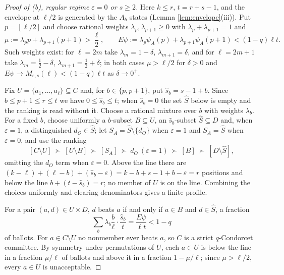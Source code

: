\documentclass[11pt]{article}
\theoremstyle{plain}
\theoremstyle{definition}
\newcommand{\fl}[1]{\left\lfloor #1\right\rfloor}
\newcommand{\eps}{\varepsilon}
\begin{document}
\begin{proof}[Proof of (b), regular regime $\eps=0$ or $s\ge2$]
Here $k\le r$, $t=r+s-1$, and the envelope at $\ell/2$ is generated by the $A_b$ states (Lemma \ref{lem:envelope}(iii)). Put $p=\fl{\ell/2}$ and choose rational weights $\lambda_p,\lambda_{p+1}\ge0$ with $\lambda_p+\lambda_{p+1}=1$ and
\[
\mu:=\lambda_p p+\lambda_{p+1}(p+1)>\frac{\ell}{2},\qquad
E\psi:=\lambda_p\psi_A(p)+\lambda_{p+1}\psi_A(p+1)<(1-q)\ell t .
\]
Such weights exist: for $\ell=2m$ take $\lambda_m=1-\delta$, $\lambda_{m+1}=\delta$, and for $\ell=2m+1$ take $\lambda_m=\tfrac12-\delta$, $\lambda_{m+1}=\tfrac12+\delta$; in both cases $\mu>\ell/2$ for $\delta>0$ and $E\psi\to M_{\eps,s}(\ell)<(1-q)\ell t$ as $\delta\to0^{+}$.

Fix $U=\{a_1,\dots,a_\ell\}\subseteq C$ and, for $b\in\{p,p+1\}$, put $\widehat s_b=s-1+b$. Since $b\le p+1\le r\le t$ we have $0\le\widehat s_b\le t$; when $\widehat s_b=0$ the set $\widehat S$ below is empty and the ranking is read without it. Choose a rational mixture over $b$ with weights $\lambda_b$. For a fixed $b$, choose uniformly a $b$-subset $B\subseteq U$, an $\widehat s_b$-subset $\widehat S\subseteq D$ and, when $\eps=1$, a distinguished $d_O\in\widehat S$; let $S_A=\widehat S\setminus\{d_O\}$ when $\eps=1$ and $S_A=\widehat S$ when $\eps=0$, and use the ranking
\[
[C\setminus U]\ \succ\ [U\setminus B]\ \succ\ [S_A]\ \succ\ d_O\ (\eps=1)\ \succ\ [B]\ \succ\ [D\setminus\widehat S],
\]
omitting the $d_O$ term when $\eps=0$. Above the line there are $(k-\ell)+(\ell-b)+(\widehat s_b-\eps)=k-b+s-1+b-\eps=r$ positions and below the line $b+(t-\widehat s_b)=r$; no member of $U$ is on the line. Combining the choices uniformly and clearing denominators gives a finite profile.

For a pair $(a,d)\in U\times D$, $d$ beats $a$ if and only if $a\in B$ and $d\in\widehat S$, a fraction
\[
\sum_b\lambda_b\frac{b}{\ell}\cdot\frac{\widehat s_b}{t}=\frac{E\psi}{\ell t}<1-q
\]
of ballots. For $a\in C\setminus U$ no nonmember ever beats $a$, so $C$ is a strict $q$-Condorcet committee. By symmetry under permutations of $U$, each $a\in U$ is below the line in a fraction $\mu/\ell$ of ballots and above it in a fraction $1-\mu/\ell$; since $\mu>\ell/2$, every $a\in U$ is unacceptable.
\end{proof}
\end{document}
